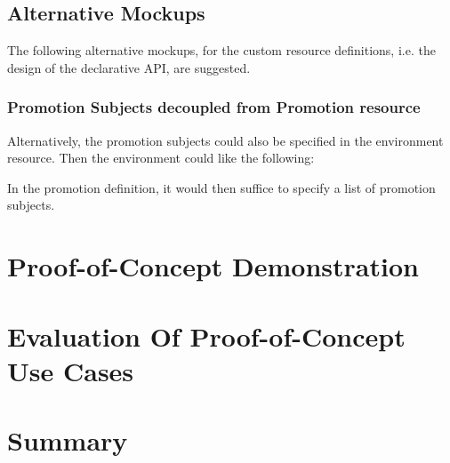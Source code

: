 \subsection*{Alternative Mockups}

The following alternative mockups,
for the custom resource definitions,
i.e. the design of the declarative API,
are suggested.

\subsubsection*{Promotion Subjects decoupled from Promotion resource}

Alternatively, the promotion subjects could also be specified
in the environment resource.
Then the environment could like the following:



In the promotion definition,
it would then suffice to specify
a list of promotion subjects.














\section{Proof-of-Concept Demonstration}
\section{Evaluation Of Proof-of-Concept Use Cases}
\section{Summary}







